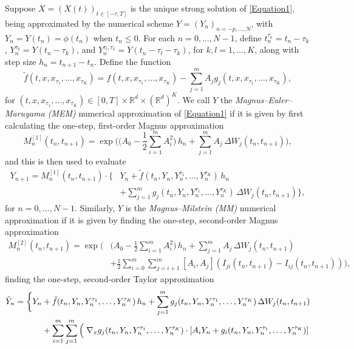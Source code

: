 \documentclass[onefignum]{siamart250211}
\begin{document}

\begin{definition}\label{MEMandMMSDDESchemes}
Suppose $X=(X(t))_{t\in[-\tau,T]}$ is the unique strong solution of \cref{Equation1}, being approximated by the numerical scheme $Y=(Y_n)_{n=-p,\ldots,N}$, with $Y_n=Y(t_n)=\phi(t_n)$ when $t_n\leqslant0$. For each $n=0,\ldots,N-1$, define $t_n^{\tau_k}=t_n-\tau_k$, $Y_n^{\tau_k}=Y(t_n-\tau_k)$, and $Y_n^{\tau_l,\tau_k}=Y(t_n-\tau_l-\tau_k)$, for $k,l=1,\ldots,K$, along with step size $h_n=t_{n+1}-t_n$. Define the function
\[\tilde{f}(t,x,x_{\tau_1},\ldots,x_{\tau_K})=f(t,x,x_{\tau_1},\ldots,x_{\tau_K})-\sum_{j=1}^mA_jg_j(t,x,x_{\tau_1},\ldots,x_{\tau_K}),\]
for $(t,x,x_{\tau_1},\ldots,x_{\tau_K})\in[0,T]\times\mathbb{R}^d\times(\mathbb{R}^d)^K$. We call $Y$ the \emph{Magnus--Euler--Maruyama (MEM)} numerical approximation of \cref{Equation1} if it is given by first calculating the one-step, first-order Magnus approximation
\[M_n^{[1]}(t_n,t_{n+1})=\exp\bigg(\bigg(A_0-\frac{1}{2}\sum_{i=1}^mA_i^2\bigg)\,h_n+\sum_{j=1}^mA_j\,\Delta W_j(t_n,t_{n+1})\bigg),\]
and this is then used to evaluate
\begin{align}Y_{n+1}=M_n^{[1]}(t_n,t_{n+1})\cdot\bigg\{&Y_n+\tilde{f}(t_n,Y_n,Y_n^{\tau_1},\ldots,Y_n^{\tau_K})\,h_n\label{SDDEMEM}\\
&+\sum_{j=1}^mg_j(t_n,Y_n,Y_n^{\tau_1},\ldots,Y_n^{\tau_K})\,\Delta W_j(t_n,t_{n+1})\bigg\},\nonumber\end{align}
for $n=0,\ldots,N-1$. Similarly, $Y$ is the \emph{Magnus--Milstein (MM)} numerical approximation if it is given by finding the one-step, second-order Magnus approximation
\begin{align*}
M_n^{[2]}(t_n,t_{n+1})=\exp\bigg(&\bigg(A_0-\frac{1}{2}\sum_{i=1}^mA_i^2\bigg)\,h_n+\sum_{j=1}^mA_j\,\Delta W_j(t_n,t_{n+1})\\
&+\frac{1}{2}\sum_{i=0}^m\sum_{j=i+1}^m[A_i,A_j](I_{ji}(t_n,t_{n+1})-I_{ij}(t_n,t_{n+1}))\bigg),
\end{align*}
finding the one-step, second-order Taylor approximation
\begin{align}
\tilde{Y}_n=\bigg\{Y_n&+\tilde{f}(t_n,Y_n,Y_n^{\tau_1},\ldots,Y_n^{\tau_K})\,h_n+\sum_{j=1}^mg_j(t_n,Y_n,Y_n^{\tau_1},\ldots,Y_n^{\tau_K})\,\Delta W_j(t_n,t_{n+1})\nonumber\\
&+\sum_{i=1}^m\sum_{j=1}^m\left(\vphantom{\sum}\right.\nabla_xg_j(t_n,Y_n,Y_n^{\tau_1},\ldots,Y_n^{\tau_K})\cdot\left[A_iY_n+g_i(t_n,Y_n,Y_n^{\tau_1},\ldots,Y_n^{\tau_K})\right]\nonumber\\

\end{align}
\end{definition}
\end{document}
